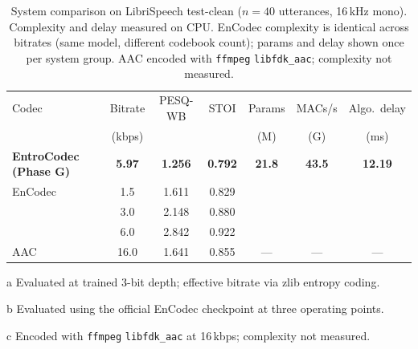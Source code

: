 \begin{table}[t]
\caption[System comparison on LibriSpeech test-clean]{System comparison on LibriSpeech test-clean ($n=40$ utterances, 16\,kHz mono).
Complexity and delay measured on CPU\@.
EnCodec complexity is identical across bitrates (same model, different codebook count);
params and delay shown once per system group.
AAC encoded with \texttt{ffmpeg} \texttt{libfdk\_aac}; complexity not measured.}
\label{tab:system_comparison}
\begin{threeparttable}
\small
\begin{tabular}{l
S[table-format=2.1]
S[table-format=1.3]
S[table-format=1.3]
S[table-format=2.1]
S[table-format=2.1]
S[table-format=2.2]}
\toprule
{Codec}
& {Bitrate}
& {PESQ-WB}
& {STOI}
& {Params}
& {MACs/s}
& {Algo.\ delay} \\
& {(kbps)}
&
&
& {(M)}
& {(G)}
& {(ms)} \\
\midrule
\textbf{EntroCodec (Phase G)}
& {\bfseries 5.97}
& {\bfseries 1.256}
& {\bfseries 0.792}
& {\bfseries 21.8}
& {\bfseries 43.5}
& {\bfseries 12.19} \\
\midrule
EnCodec
& 1.5
& 1.611
& 0.829
& {}
& {}
& {} \\
& 3.0
& 2.148
& 0.880
&
&
& \\
& 6.0
& 2.842
& 0.922
&
&
& \\
\midrule
AAC
& 16.0
& 1.641
& 0.855
& {---}
& {---}
& {---} \\
\bottomrule
\end{tabular}
\begin{tablenotes}
\footnotesize
\item[a] Evaluated at trained 3-bit depth; effective bitrate via zlib entropy coding.
\item[b] Evaluated using the official EnCodec checkpoint at three operating points.
\item[c] Encoded with \texttt{ffmpeg} \texttt{libfdk\_aac} at 16\,kbps; complexity not measured.
\end{tablenotes}
\end{threeparttable}
\end{table}

